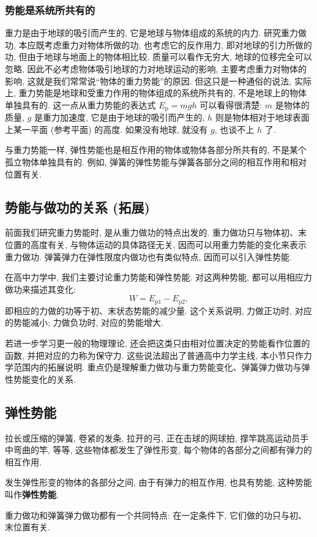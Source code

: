 \documentclass[UTF8,openany,fontset=fandol]{ctexbook}
\theoremstyle{chinesetextbook}
\begin{document}
\subsubsection{势能是系统所共有的}
重力是由于地球的吸引而产生的, 它是地球与物体组成的系统的内力. 研究重力做功, 本应既考虑重力对物体所做的功, 也考虑它的反作用力, 即对地球的引力所做的功, 但由于地球与地面上的物体相比较, 质量可以看作无穷大, 地球的位移完全可以忽略, 因此不必考虑物体吸引地球的力对地球运动的影响, 主要考虑重力对物体的影响, 这就是我们常常说“物体的重力势能”的原因. 但这只是一种通俗的说法, 实际上, 重力势能是地球和受重力作用的物体组成的系统所共有的, 不是地球上的物体单独具有的. 这一点从重力势能的表达式 $E_\mathrm{p}=mgh$ 可以看得很清楚: $m$ 是物体的质量, $g$ 是重力加速度, 它是由于地球的吸引而产生的, $h$ 则是物体相对于地球表面上某一平面 (参考平面) 的高度. 如果没有地球, 就没有 $g$, 也谈不上 $h$ 了.

与重力势能一样, 弹性势能也是相互作用的物体或物体各部分所共有的, 不是某个孤立物体单独具有的. 例如, 弹簧的弹性势能与弹簧各部分之间的相互作用和相对位置有关.
\subsection{势能与做功的关系 (拓展)}
前面我们研究重力势能时, 是从重力做功的特点出发的. 重力做功只与物体初、末位置的高度有关, 与物体运动的具体路径无关, 因而可以用重力势能的变化来表示重力做功. 弹簧弹力在弹性限度内做功也有类似特点, 因而可以引入弹性势能.

在高中力学中, 我们主要讨论重力势能和弹性势能. 对这两种势能, 都可以用相应力做功来描述其变化:
\[
W=E_{\text{p}1}-E_{\text{p}2},
\]
即相应的力做的功等于初、末状态势能的减少量. 这个关系说明, 力做正功时, 对应的势能减小; 力做负功时, 对应的势能增大.

若进一步学习更一般的物理理论, 还会把这类只由相对位置决定的势能看作位置的函数, 并把对应的力称为保守力. 这些说法超出了普通高中力学主线, 本小节只作力学范围内的拓展说明. 重点仍是理解重力做功与重力势能变化、弹簧弹力做功与弹性势能变化的关系.
\subsection{弹性势能}
拉长或压缩的弹簧, 卷紧的发条, 拉开的弓, 正在击球的网球拍, 撑竿跳高运动员手中弯曲的竿, 等等, 这些物体都发生了弹性形变, 每个物体的各部分之间都有弹力的相互作用.

发生弹性形变的物体的各部分之间, 由于有弹力的相互作用, 也具有势能, 这种势能叫作\textbf{弹性势能}.

重力做功和弹簧弹力做功都有一个共同特点: 在一定条件下, 它们做的功只与初、末位置有关.
\end{document}
